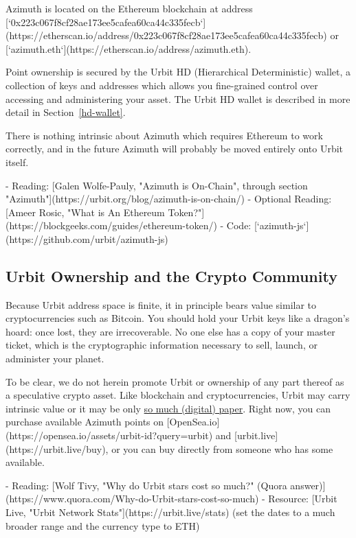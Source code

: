 {{{Azimuth is located on the Ethereum blockchain at address [`0x223c067f8cf28ae173ee5cafea60ca44c335fecb`](https://etherscan.io/address/0x223c067f8cf28ae173ee5cafea60ca44c335fecb) or [`azimuth.eth`](https://etherscan.io/address/azimuth.eth).

Point ownership is secured by the Urbit HD (Hierarchical Deterministic) wallet, a collection of keys and addresses which allows you fine-grained control over accessing and administering your asset.  The Urbit HD wallet is described in more detail in Section~\ref{hd-wallet}.

There is nothing intrinsic about Azimuth which requires Ethereum to work correctly, and in the future Azimuth will probably be moved entirely onto Urbit itself.

- Reading: [Galen Wolfe-Pauly, "Azimuth is On-Chain", through section "Azimuth"](https://urbit.org/blog/azimuth-is-on-chain/)
- Optional Reading: [Ameer Rosic, "What is An Ethereum Token?"](https://blockgeeks.com/guides/ethereum-token/)
- Code: [`azimuth-js`](https://github.com/urbit/azimuth-js)


\subsection{Urbit Ownership and the Crypto Community}

Because Urbit address space is finite, it in principle bears value similar to cryptocurrencies such as Bitcoin.  You should hold your Urbit keys like a dragon's hoard:  once lost, they are irrecoverable.  No one else has a copy of your master ticket, which is the cryptographic information necessary to sell, launch, or administer your planet.

To be clear, we do not herein promote Urbit or ownership of any part thereof as a speculative crypto asset.  Like blockchain and cryptocurrencies, Urbit may carry intrinsic value or it may be only \href{https://en.wikipedia.org/wiki/Wildcat_banking}{so much (digital) paper}.  Right now, you can purchase available Azimuth points on [OpenSea.io](https://opensea.io/assets/urbit-id?query=urbit) and [urbit.live](https://urbit.live/buy), or you can buy directly from someone who has some available.

- Reading: [Wolf Tivy, "Why do Urbit stars cost so much?" (Quora answer)](https://www.quora.com/Why-do-Urbit-stars-cost-so-much)
- Resource: [Urbit Live, "Urbit Network Stats"](https://urbit.live/stats) (set the dates to a much broader range and the currency type to ETH)


}}}

